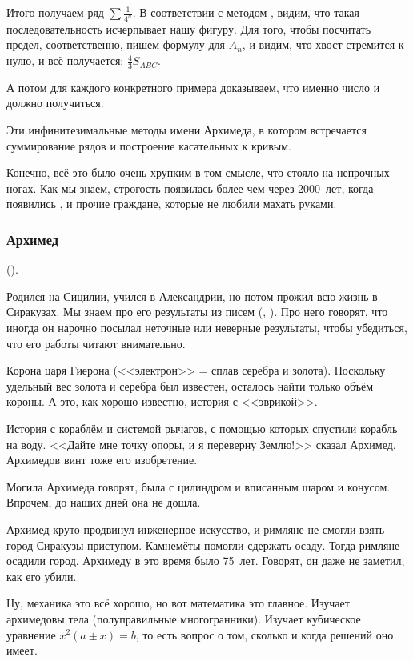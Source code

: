 \documentclass[a4paper,oneside,fleqn,10pt]{article}
\begin{document}

Итого получаем ряд $\sum\frac{1}{4^n}$. В соответствии с методом
, видим, что такая последовательность
исчерпывает нашу фигуру. Для того, чтобы посчитать предел,
соответственно, пишем формулу для $A_n$, и видим, что хвост стремится
к нулю, и всё получается: $\frac43S_{ABC}$.

А потом для каждого конкретного примера доказываем, что именно число и
должно получиться.

Эти инфинитезимальные методы имени Архимеда, в котором встречается
суммирование рядов и построение касательных к кривым.

Конечно, всё это было очень хрупким в том смысле, что стояло на
непрочных ногах.  Как мы знаем, строгость появилась более чем через
2000~лет, когда появились ,  и прочие
граждане, которые не любили махать руками.

\subsubsection{Архимед}

 ().

Родился на Сицилии, учился в Александрии, но потом прожил всю жизнь в
Сиракузах.  Мы знаем про его результаты из писем (,
). Про него говорят, что иногда он нарочно посылал
неточные или неверные результаты, чтобы убедиться, что его работы
читают внимательно.

Корона царя Гиерона (<<электрон>> = сплав серебра и золота). Поскольку
удельный вес золота и серебра был известен, осталось найти только
объём короны. А это, как хорошо известно, история с <<эврикой>>.

История с кораблём и системой рычагов, с помощью которых спустили
корабль на воду.  <<Дайте мне точку опоры, и я переверну Землю!>>
сказал Архимед.  Архимедов винт тоже его изобретение.

Могила Архимеда говорят, была с цилиндром и вписанным шаром и конусом.
Впрочем, до наших дней она не дошла.

Архимед круто продвинул инженерное искусство, и римляне не смогли
взять город Сиракузы приступом.  Камнемёты помогли сдержать
осаду. Тогда римляне осадили город.  Архимеду в это время было
75~лет. Говорят, он даже не заметил, как его убили.

Ну, механика это всё хорошо, но вот математика это главное.  Изучает
архимедовы тела (полуправильные многогранники).  Изучает кубическое
уравнение $x^2 (a\pm x) = b$, то есть вопрос о том, сколько и когда
решений оно имеет.
\end{document}
